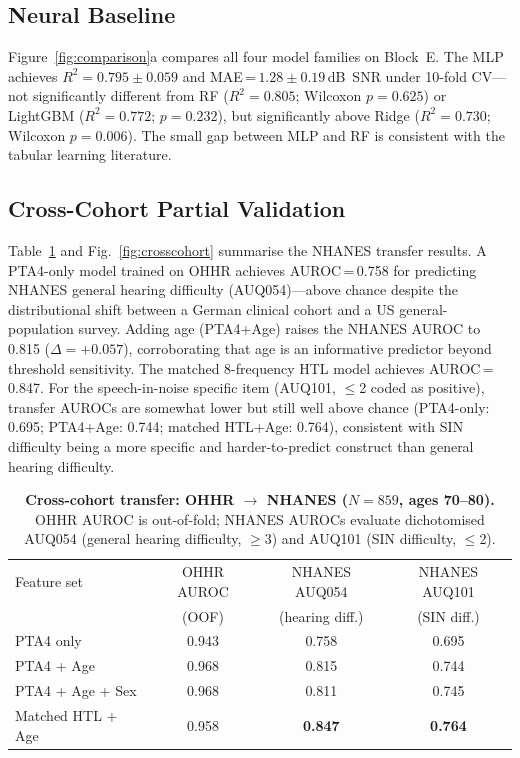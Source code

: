 \documentclass[12pt,a4paper]{article}
\begin{document}
\subsection{Neural Baseline}

Figure~\ref{fig:comparison}a compares all four model families on Block~E.
The MLP achieves $R^2=0.795\pm0.059$ and MAE\,=\,$1.28\pm0.19$\,dB~SNR
under 10-fold CV---not significantly different from RF ($R^2=0.805$;
Wilcoxon $p=0.625$) or LightGBM ($R^2=0.772$; $p=0.232$), but
significantly above Ridge ($R^2=0.730$; Wilcoxon $p=0.006$).  The small gap between MLP and RF
is consistent with the tabular learning literature\cite{Gorishniy2021Revisiting}.

\subsection{Cross-Cohort Partial Validation}

Table~\ref{tab:crosscohort} and Fig.~\ref{fig:crosscohort} summarise the
NHANES transfer results.  A PTA4-only model trained on OHHR achieves
AUROC\,=\,0.758 for predicting NHANES general hearing difficulty (AUQ054)---above
chance despite the distributional shift between a German clinical cohort and a
US general-population survey.  Adding age (PTA4+Age) raises the NHANES AUROC
to 0.815 ($\Delta=+0.057$), corroborating that age is an informative predictor
beyond threshold sensitivity.  The matched 8-frequency HTL model achieves
AUROC\,=\,0.847.  For the speech-in-noise specific item (AUQ101, $\leq$2
coded as positive), transfer AUROCs are somewhat lower but still well above
chance (PTA4-only: 0.695; PTA4+Age: 0.744; matched HTL+Age: 0.764),
consistent with SIN difficulty being a more specific and harder-to-predict
construct than general hearing difficulty.

\begin{table}[htbp]
\caption{\textbf{Cross-cohort transfer: OHHR $\to$ NHANES ($N=859$, ages 70--80).}
OHHR AUROC is out-of-fold; NHANES AUROCs evaluate dichotomised AUQ054
(general hearing difficulty, $\geq$3) and AUQ101 (SIN difficulty, $\leq$2).}
\label{tab:crosscohort}
\centering
\small
\begin{tabular}{lccc}
\toprule
Feature set & OHHR AUROC & NHANES AUQ054 & NHANES AUQ101 \\
            & (OOF)      & (hearing diff.) & (SIN diff.) \\
\midrule
PTA4 only         & 0.943 & 0.758 & 0.695 \\
PTA4 + Age        & 0.968 & 0.815 & 0.744 \\
PTA4 + Age + Sex  & 0.968 & 0.811 & 0.745 \\
Matched HTL + Age & 0.958 & \textbf{0.847} & \textbf{0.764} \\
\bottomrule
\end{tabular}
\end{table}
\end{document}
